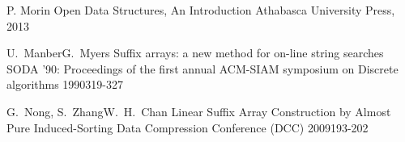 \knjigaEnAvtor
    {P. Morin}
    {Open Data Structures, An Introduction}
    {Athabasca University Press, 2013}

\konferencniClanekVecAvtorjev
    {U.~Manber}{G.~Myers}
    {Suffix arrays: a new method for on-line string searches}
    {SODA '90: Proceedings of the first annual ACM-SIAM symposium on Discrete algorithms}
    {1990}{319-327}

\konferencniClanekVecAvtorjev
    {G.~Nong, S.~Zhang}{W.~H.~Chan}
    {Linear Suffix Array Construction by Almost Pure Induced-Sorting}
    {Data Compression Conference (DCC)}
    {2009}{193-202}


